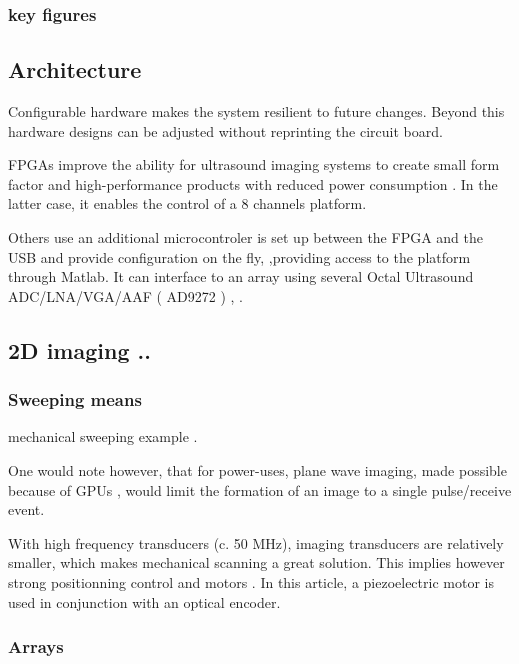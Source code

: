 \documentclass[conference]{IEEEtran}
\begin{document}
\subsubsection{key figures}

\subsection{Architecture}

 
Configurable hardware makes the system resilient to future changes.
Beyond this hardware designs can be adjusted without reprinting the circuit board.

FPGAs improve the ability for ultrasound imaging systems to create small form factor and high-performance products with reduced power consumption \cite{dusa_low_2014}. In the latter case, it enables the control of a 8 channels platform.
  
Others use  an  additional microcontroler is set up between the FPGA and the USB and provide configuration on the fly, ,providing access to the platform through Matlab. It can interface to an array using several Octal Ultrasound ADC/LNA/VGA/AAF ( AD9272 ) \cite{raj_microcontroller_2017}, \cite{raj_8051_2016}.


\subsection{2D imaging .. }

\subsubsection{Sweeping means}


mechanical sweeping example \cite{svilainis_electronics_2014}.


One would note however, that for power-uses, plane wave imaging, made possible because of GPUs \cite{hewener_mobile_2015}, would limit the formation of an image to a single pulse/receive event.


With high frequency transducers (c. 50 MHz), imaging transducers are relatively smaller, which makes mechanical scanning a great solution. This implies however strong positionning control and motors \cite{carotenuto_very_2004}. In this article, a piezoelectric	 motor is used in conjunction with an optical encoder. 


\subsubsection{Arrays}
\end{document}
